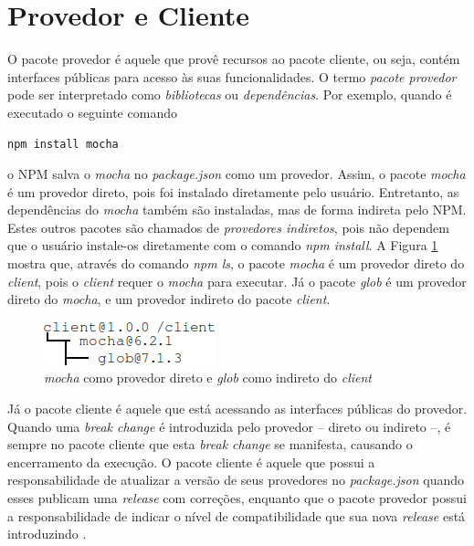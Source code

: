 \section{Provedor e Cliente}
\label{ref-teo:prov_clie}
O pacote provedor é aquele que provê recursos ao pacote cliente, ou seja, contém interfaces públicas para acesso às suas funcionalidades. O termo \textit{pacote provedor} pode ser interpretado como \textit{bibliotecas} ou \textit{dependências}. Por exemplo, quando é executado o seguinte comando

\begin{lstlisting}[style=bash, label=cod:install:provider]
npm install mocha
\end{lstlisting}
o \gls{NPM} salva o \textit{mocha} no \textit{package.json} como um provedor. Assim, o pacote \textit{mocha} é um provedor direto, pois foi instalado diretamente pelo usuário. Entretanto, as dependências do \textit{mocha} também são instaladas, mas de forma indireta pelo \gls{NPM}. Estes outros pacotes são chamados de \textit{provedores indiretos}, pois não dependem que o usuário instale-os diretamente com o comando \textit{npm install}. A Figura \ref{fig:provider} mostra que, através do comando \textit{npm ls}, o pacote \textit{mocha} é um provedor direto do \textit{client}, pois o \textit{client} requer o \textit{mocha} para executar. Já o pacote \textit{glob} é um provedor direto do \textit{mocha}, e um provedor indireto do pacote \textit{client}.

\begin{figure}
    \centering
    \includegraphics{figuras/provider_directly_undirectly.png}
    \caption{\textit{mocha} como provedor direto e \textit{glob} como indireto do \textit{client}}
    \label{fig:provider}
\end{figure}{}

Já o pacote cliente é aquele que está acessando as interfaces públicas do provedor. Quando uma \textit{break change} é introduzida pelo provedor -- direto ou indireto --, é sempre no pacote cliente que esta \textit{break change} se manifesta, causando o encerramento da execução. O pacote cliente é aquele que possui a responsabilidade de atualizar a versão de seus provedores no \textit{package.json} quando esses publicam uma \textit{release} com correções, enquanto que o pacote provedor possui a responsabilidade de indicar o nível de compatibilidade que sua nova \textit{release} está introduzindo \cite{teorical_reference:semver}.

